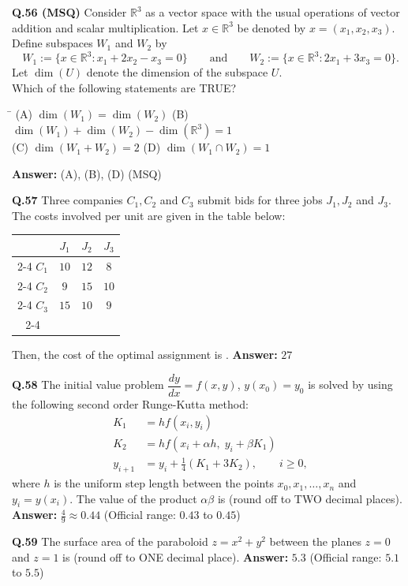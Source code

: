 \documentclass[11pt,a4paper]{article}
\newcommand{\optsfourA}[4]{%
  \begin{tabbing}
    \hspace{0.48\linewidth}\=\kill
    (A) #1 \> (B) #2 \\[2pt]
    (C) #3 \> (D) #4
  \end{tabbing}%
}
\newcommand{\ans}[1]{\textbf{Answer:} #1\par\medskip}
\begin{document}
\textbf{Q.56 (MSQ)} Consider $\mathbb{R}^3$ as a vector space with the usual operations of vector addition and scalar multiplication. Let $x \in \mathbb{R}^3$ be denoted by $x = (x_1, x_2, x_3)$. Define subspaces $W_1$ and $W_2$ by
\[
  W_1 := \{x \in \mathbb{R}^3 : x_1 + 2x_2 - x_3 = 0\} \qquad \text{and} \qquad W_2 := \{x \in \mathbb{R}^3 : 2x_1 + 3x_3 = 0\}.
\]
Let $\dim(U)$ denote the dimension of the subspace $U$.\\
Which of the following statements are TRUE?
\optsfourA{$\dim(W_1) = \dim(W_2)$}{$\dim(W_1) + \dim(W_2) - \dim(\mathbb{R}^3) = 1$}{$\dim(W_1 + W_2) = 2$}{$\dim(W_1 \cap W_2) = 1$}
\ans{(A), (B), (D) (MSQ)}

\textbf{Q.57} Three companies $C_1, C_2$ and $C_3$ submit bids for three jobs $J_1, J_2$ and $J_3$. The costs involved per unit are given in the table below:
\begin{center}
\begin{tabular}{c|ccc|}
\multicolumn{1}{c}{} & $J_1$ & $J_2$ & \multicolumn{1}{c}{$J_3$} \\
\cline{2-4}
$C_1$ & $10$ & $12$ & $8$ \\
\cline{2-4}
$C_2$ & $9$ & $15$ & $10$ \\
\cline{2-4}
$C_3$ & $15$ & $10$ & $9$ \\
\cline{2-4}
\end{tabular}
\end{center}
Then, the cost of the optimal assignment is \underline{\hspace{2cm}}.
\ans{$27$}

\textbf{Q.58} The initial value problem $\dfrac{dy}{dx} = f(x, y)$, $y(x_0) = y_0$ is solved by using the following second order Runge-Kutta method:
\begin{align*}
  K_1 &= h f(x_i, y_i) \\
  K_2 &= h f(x_i + \alpha h,\; y_i + \beta K_1) \\
  y_{i+1} &= y_i + \frac{1}{4}(K_1 + 3K_2), \qquad i \ge 0,
\end{align*}
where $h$ is the uniform step length between the points $x_0, x_1, \dots, x_n$ and $y_i = y(x_i)$. The value of the product $\alpha\beta$ is \underline{\hspace{2cm}} (round off to TWO decimal places).
\ans{$\frac{4}{9} \approx 0.44$ (Official range: $0.43$ to $0.45$)}

\textbf{Q.59} The surface area of the paraboloid $z = x^2 + y^2$ between the planes $z = 0$ and $z = 1$ is \underline{\hspace{2cm}} (round off to ONE decimal place).
\ans{$5.3$ (Official range: $5.1$ to $5.5$)}
\end{document}

